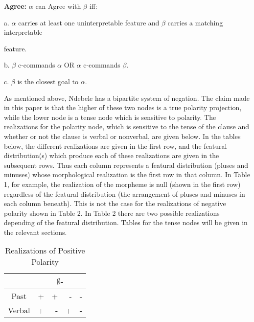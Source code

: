 \documentclass[output=paper]{langsci/langscibook}
\begin{document}
\begin{exe}
\ex \textbf{Agree:} $\alpha$ can Agree with $\beta$ iff:


a. $\alpha$ carries at least one uninterpretable feature and $\beta$ carries a matching interpretable 

feature.


b. $\beta$ c-commands $\alpha$ OR $\alpha$ c-commands $\beta$.


c. $\beta$ is the closest goal to $\alpha$.
\end{exe}

As mentioned above, Ndebele has a bipartite system of negation. The claim made in this paper is that the higher of these two nodes is a true polarity projection, while the lower node is a tense node which is sensitive to polarity. The realizations for the polarity node, which is sensitive to the tense of the clause and whether or not the clause is verbal or nonverbal, are given below. In the tables below, the different realizations are given in the first row, and the featural distribution(s) which produce each of these realizations are given in the subsequent rows. Thus each column represents a featural distribution (pluses and minuses) whose morphological realization is the first row in that column. In Table 1, for example, the realization of the morpheme is null (shown in the first row) regardless of the featural distribution (the arrangement of pluses and minuses in each column beneath). This is not the case for the realizations of negative polarity shown in Table 2. In Table 2 there are two possible realizations depending of the featural distribution. Tables for the tense nodes will be given in the relevant sections.




\begin{table}
\caption{Realizations of Positive Polarity} %
\centering %
\begin{tabular}{c| rrrr} %
\hline %
  &\multicolumn{4}{c}{$\emptyset$-} \\ [0.5ex] 
\hline %
Past & + & + & - & -\\ %
Verbal & + & - & +& -\\[1ex] %
\hline %
\end{tabular} 
\label{tab:hresult} 
\end{table} 
\end{document}
